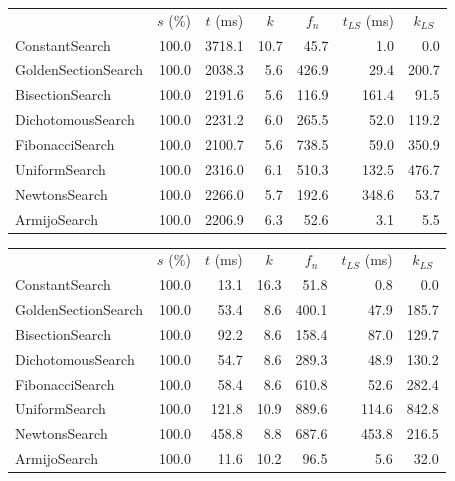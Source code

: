 \documentclass[a4paper,english,titlepage,12pt]{article}
\begin{document}
\begin{center}
\label{tab:performance_results_NE_NM}
\begin{tabular}{|l|r|r|r|r|r|r|}
\hline
\rowcolor{gray!25}
\multicolumn{1}{|c|}{Line Search Name} & \multicolumn{1}{c|}{$s$ (\%)} & \multicolumn{1}{c|}{$t$ (ms)} & \multicolumn{1}{c|}{$k$} & \multicolumn{1}{c|}{$f_n$} & \multicolumn{1}{c|}{$t_{LS}$ (ms)} & \multicolumn{1}{c|}{$k_{LS}$} \\
ConstantSearch & 100.0 & 3718.1 & 10.7 & 45.7 & 1.0 & 0.0 \\
GoldenSectionSearch & 100.0 & 2038.3 & 5.6 & 426.9 & 29.4 & 200.7 \\
BisectionSearch & 100.0 & 2191.6 & 5.6 & 116.9 & 161.4 & 91.5 \\
DichotomousSearch & 100.0 & 2231.2 & 6.0 & 265.5 & 52.0 & 119.2 \\
FibonacciSearch & 100.0 & 2100.7 & 5.6 & 738.5 & 59.0 & 350.9 \\
UniformSearch & 100.0 & 2316.0 & 6.1 & 510.3 & 132.5 & 476.7 \\
NewtonsSearch & 100.0 & 2266.0 & 5.7 & 192.6 & 348.6 & 53.7 \\
ArmijoSearch & 100.0 & 2206.9 & 6.3 & 52.6 & 3.1 & 5.5 \\
\hline
\end{tabular}
\end{center}

\begin{center}
\label{tab:performance_results_NE_GDM}
\begin{tabular}{|l|r|r|r|r|r|r|}
\hline
\rowcolor{gray!25}
\multicolumn{1}{|c|}{Line Search Name} & \multicolumn{1}{c|}{$s$ (\%)} & \multicolumn{1}{c|}{$t$ (ms)} & \multicolumn{1}{c|}{$k$} & \multicolumn{1}{c|}{$f_n$} & \multicolumn{1}{c|}{$t_{LS}$ (ms)} & \multicolumn{1}{c|}{$k_{LS}$} \\
ConstantSearch & 100.0 & 13.1 & 16.3 & 51.8 & 0.8 & 0.0 \\
GoldenSectionSearch & 100.0 & 53.4 & 8.6 & 400.1 & 47.9 & 185.7 \\
BisectionSearch & 100.0 & 92.2 & 8.6 & 158.4 & 87.0 & 129.7 \\
DichotomousSearch & 100.0 & 54.7 & 8.6 & 289.3 & 48.9 & 130.2 \\
FibonacciSearch & 100.0 & 58.4 & 8.6 & 610.8 & 52.6 & 282.4 \\
UniformSearch & 100.0 & 121.8 & 10.9 & 889.6 & 114.6 & 842.8 \\
NewtonsSearch & 100.0 & 458.8 & 8.8 & 687.6 & 453.8 & 216.5 \\
ArmijoSearch & 100.0 & 11.6 & 10.2 & 96.5 & 5.6 & 32.0 \\
\hline
\end{tabular}
\end{center}
\end{document}
